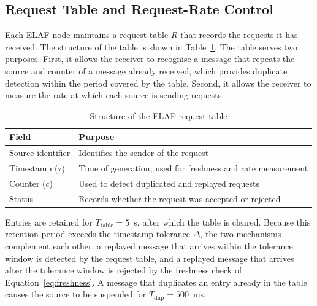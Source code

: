 \subsection{Request Table and Request-Rate Control}
\label{sec:m-rate}

Each ELAF node maintains a request table $R$ that records the requests it has received. The structure of the table is shown in Table~\ref{tab:reqtable}. The table serves two purposes. First, it allows the receiver to recognise a message that repeats the source and counter of a message already received, which provides duplicate detection within the period covered by the table. Second, it allows the receiver to measure the rate at which each source is sending requests.

\begin{table}[htbp]
  \centering
  \caption{Structure of the ELAF request table}
  \label{tab:reqtable}
  \renewcommand{\arraystretch}{1.2}
  \begin{tabularx}{\textwidth}{@{}l X@{}}
    \toprule
    \textbf{Field}       & \textbf{Purpose}                                       \\
    \midrule
    Source identifier    & Identifies the sender of the request                  \\
    Timestamp ($\tau$)   & Time of generation, used for freshness and rate measurement \\
    Counter ($c$)        & Used to detect duplicated and replayed requests        \\
    Status               & Records whether the request was accepted or rejected   \\
    \bottomrule
  \end{tabularx}
\end{table}

Entries are retained for $T_{\mathrm{table}} = 5$~s, after which the table is cleared. Because this retention period exceeds the timestamp tolerance $\Delta$, the two mechanisms complement each other: a replayed message that arrives within the tolerance window is detected by the request table, and a replayed message that arrives after the tolerance window is rejected by the freshness check of Equation~\ref{eq:freshness}. A message that duplicates an entry already in the table causes the source to be suspended for $T_{\mathrm{dup}} = 500$~ms.

